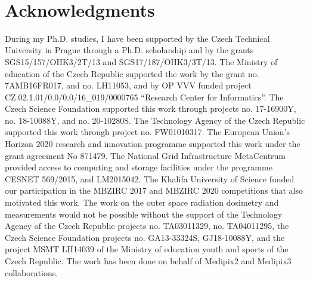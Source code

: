 
~\vfill{}

\section*{Acknowledgments}

\todo{}

During my Ph.D. studies, I have been supported by the Czech Technical University in Prague through a Ph.D. scholarship and by the grants SGS15/157/OHK3/2T/13 and SGS17/187/OHK3/3T/13.
The Ministry of education of the Czech Republic supported the work by the grant no. 7AMB16FR017, and no. LH11053, and by OP VVV funded project CZ.02.1.01/0.0/0.0/16\_019/0000765 ``Research Center for Informatics''.
The Czech Science Foundation supported this work through projects no. 17-16900Y, no. 18-10088Y, and no. 20-10280S.
The Technology Agency of the Czech Republic supported this work through project no. FW01010317.
The European Union’s Horizon 2020 research and innovation programme supported this work under the grant agreement No 871479.
The National Grid Infrastructure MetaCentrum provided access to computing and storage facilities under the programme CESNET 569/2015, and LM2015042.
The Khalifa University of Science funded our participation in the MBZIRC 2017 and MBZIRC 2020 competitions that also motivated this work.
The work on the outer space radiation dosimetry and measurements would not be possible without the support of the Technology Agency of the Czech Republic projects no. TA03011329, no. TA04011295, the Czech Science Foundation projects no. GA13-33324S, GJ18-10088Y, and the project MSMT LH14039 of the Ministry of education youth and sports of the Czech Republic.
The work has been done on behalf of Medipix2 and Medipix3 collaborations.

\vspace{2.5cm}
